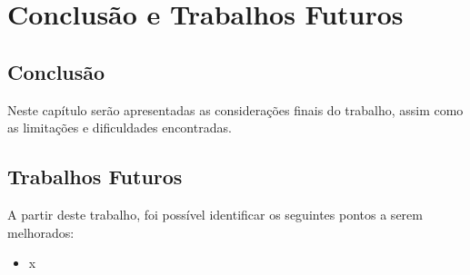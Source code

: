 \chapter{Conclusão e Trabalhos Futuros}

\section{Conclusão}

Neste capítulo serão apresentadas as considerações finais do trabalho, assim como
as limitações e dificuldades encontradas.

\section{Trabalhos Futuros}

A partir deste trabalho, foi possível identificar os seguintes pontos a serem melhorados:
\begin{itemize}
 \item x
\end{itemize}
